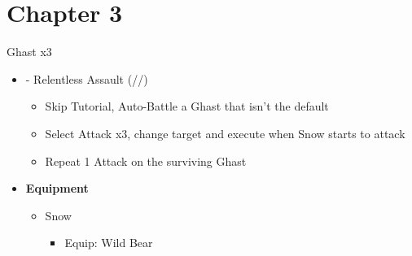 \chapter{Chapter 3}

\renewcommand{\first}{[1] - Relentless Assault (\com/\rav/\rav)}

	\begin{battle}[0:11]{Ghast x3}
		\begin{itemize}
			\item \first
			      \begin{itemize}
				      \item Skip Tutorial, Auto-Battle a Ghast that isn't the default
				      \item Select Attack x3, change target and execute when Snow starts to attack
				      \item Repeat 1 Attack on the surviving Ghast
			      \end{itemize}
		\end{itemize}
	\end{battle}
	\begin{menu}
		\begin{itemize}
			\item \textbf{Equipment}
			      \begin{itemize}
				      \item Snow
				            \begin{itemize}
					            \item Equip: Wild Bear
				            \end{itemize}
			      \end{itemize}
		\end{itemize}
	\end{menu}

